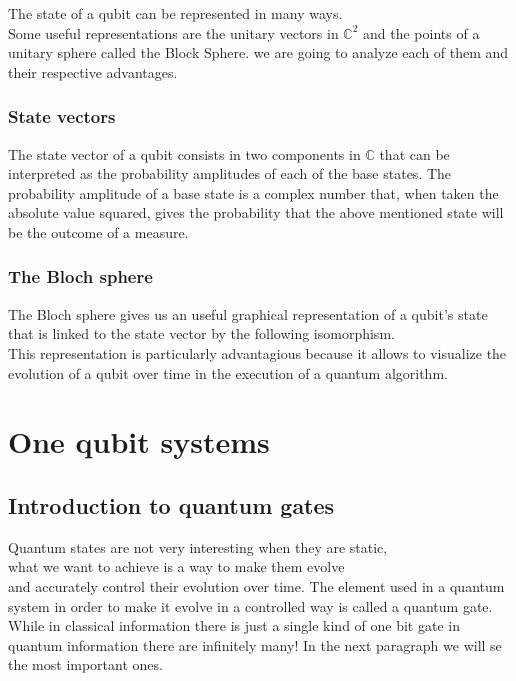 \documentclass{article}
\begin{document}
The state of a qubit can be represented in many ways.\\
Some useful representations are the unitary vectors in $\mathbb{C}^2$
and the points of a unitary sphere called the Block Sphere.
we are going to analyze each of them and their respective advantages.

\subsubsection{State vectors}

The state vector of a qubit consists in two components in $\mathbb{C}$
that can be interpreted as the probability amplitudes of each of the
base states.
The probability amplitude of a base state is a complex number that,
when taken the absolute value squared, gives the probability that the
above mentioned state will be the outcome
of a measure. %

\subsubsection{The Bloch sphere}

The Bloch sphere gives us an useful graphical representation of a
qubit's state that is linked to the state vector by the following
isomorphism.\\



This representation is particularly advantagious because it allows
to visualize the evolution of a qubit over time in the execution
of a quantum algorithm.

\newpage

\section{One qubit systems}


\subsection{Introduction to quantum gates}
Quantum states are not very interesting when they are static, \\
what we want to achieve is a way to make them evolve\\
and accurately control their evolution over time.
The element used in a quantum system in order to make it evolve
in a controlled way is called a quantum gate.\\
While in classical information there is just a single kind of one bit
gate in quantum information there are infinitely many!
In the next paragraph we will se the most important ones.
\end{document}
